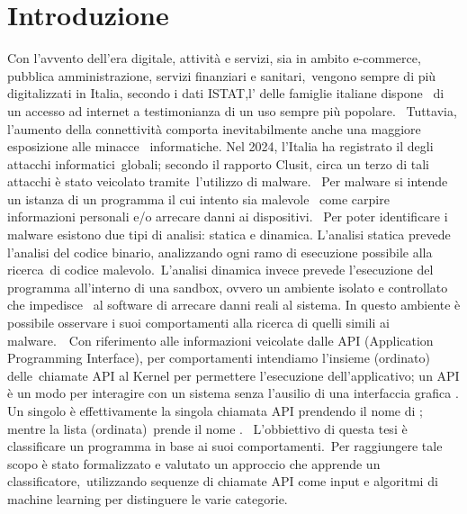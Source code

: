 

\chapter{Introduzione}



Con l'avvento dell'era digitale, attività e servizi, sia in ambito e-commerce, pubblica amministrazione, servizi finanziari e sanitari,\
vengono sempre di più digitalizzati in Italia, secondo i dati ISTAT,l' delle famiglie italiane dispone \
di un accesso ad internet a testimonianza di un uso sempre più popolare.
\
Tuttavia, l'aumento della connettività comporta inevitabilmente anche una maggiore esposizione alle minacce \
informatiche. Nel 2024, l'Italia ha registrato il  degli attacchi informatici\
globali; secondo il rapporto Clusit, circa un terzo di tali attacchi è stato veicolato tramite\
l'utilizzo di malware.
\
Per malware si intende un istanza di un programma il cui intento sia malevole \
come carpire informazioni personali e/o arrecare danni ai dispositivi.
\
Per poter identificare i malware esistono due tipi di analisi: statica e dinamica.
L'analisi statica prevede l'analisi del codice binario, analizzando ogni ramo di esecuzione possibile alla ricerca\
di codice malevolo.\
L'analisi dinamica invece prevede l'esecuzione del programma all'interno di una sandbox, ovvero un ambiente isolato e controllato che impedisce \
al software di arrecare danni reali al sistema. In questo ambiente è possibile osservare i suoi comportamenti alla ricerca
di quelli simili ai malware\mycite{doi:10.1155/2015/659101}.\
\
Con riferimento alle informazioni veicolate dalle API (Application Programming Interface), per comportamenti intendiamo l'insieme (ordinato) delle\
chiamate API al Kernel per permettere l'esecuzione dell'applicativo; un API è un modo per interagire con un sistema senza l'ausilio di una interfaccia grafica .
Un singolo \myquote{comportamento} è effettivamente la singola chiamata API prendendo il nome di ; mentre la lista (ordinata)\
prende il nome .
\
L'obbiettivo di questa tesi è classificare un programma in base ai suoi comportamenti.\
Per raggiungere tale scopo è stato formalizzato e valutato un approccio che apprende un classificatore,\
utilizzando sequenze di chiamate API come input e algoritmi di machine learning per distinguere le varie categorie.

